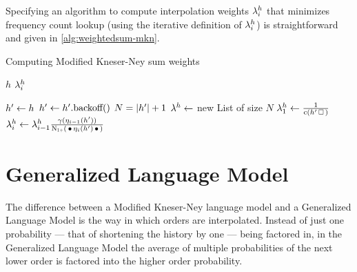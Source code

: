 
Specifying an algorithm to compute interpolation weights $\lambda_i^h$ that
minimizes frequency count lookup (using the iterative definition of
$\lambda_i^h$) is straightforward and given in \cref{alg:weightedsum-mkn}.

\begin{algorithm}
  \caption{Computing Modified Kneser-Ney sum weights}
  \label{alg:weightedsum-mkn}
  \begin{algorithmic}[1]
    \Require $h$
    \Ensure $\lambda_i^h$

    \State $h^\prime \gets h$
      \State $h^\prime \gets h^\prime\text{.backoff()}$
    \EndWhile
    \State $N = {\left|h^\prime\right|} + 1$
    \State $\lambda^h \gets$ new List of size $N$
    \State $\SumWeight_1^h \gets \frac{1}{\Count(\SeenHistory \Skp)}$
      \State $\SumWeight_i^h \gets \SumWeight_{i-1}^h \frac{\gamma(\History_{i-1}(\SeenHistory))}{\ContCountIp(\WSkp \History_i(\SeenHistory) \WSkp)}$
    \EndFor
  \end{algorithmic}
\end{algorithm}

\section{Generalized Language Model}

The difference between a Modified Kneser-Ney language model and a
Generalized Language Model is the way in which orders are interpolated.
Instead of just one probability --- that of shortening the history by one ---
being factored in, in the Generalized Language Model the average of multiple
probabilities of the next lower order is factored into the higher order
probability.

